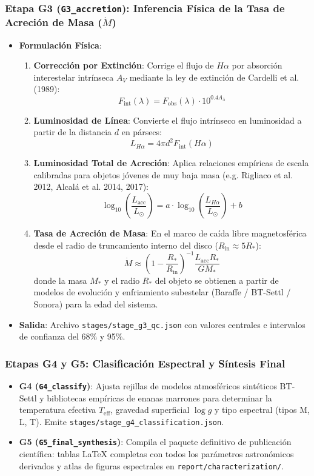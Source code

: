 \documentclass[11pt,a4paper]{article}
\begin{document}
\subsubsection{Etapa G3 (\texttt{G3\_accretion}): Inferencia Física de la Tasa de Acreción de Masa (\texorpdfstring{$\dot{M}$}{Mdot})}
\begin{itemize}[leftmargin=1.0cm]
    \item \textbf{Formulación Física}:
    \begin{enumerate}
        \item \textbf{Corrección por Extinción}: Corrige el flujo de $H\alpha$ por absorción interestelar intrínseca $A_V$ mediante la ley de extinción de Cardelli et al. (1989):
        $$F_\text{int}(\lambda) = F_\text{obs}(\lambda) \cdot 10^{0.4 A_\lambda}$$
        \item \textbf{Luminosidad de Línea}: Convierte el flujo intrínseco en luminosidad a partir de la distancia $d$ en pársecs:
        $$L_{H\alpha} = 4\pi d^2 F_\text{int}(H\alpha)$$
        \item \textbf{Luminosidad Total de Acreción}: Aplica relaciones empíricas de escala calibradas para objetos jóvenes de muy baja masa (e.g. Rigliaco et al. 2012, Alcalá et al. 2014, 2017):
        $$\log_{10}\left(\frac{L_\text{acc}}{L_\odot}\right) = a \cdot \log_{10}\left(\frac{L_{H\alpha}}{L_\odot}\right) + b$$
        \item \textbf{Tasa de Acreción de Masa}: En el marco de caída libre magnetosférica desde el radio de truncamiento interno del disco ($R_\text{in} \approx 5 R_*$):
        $$\dot{M} \approx \left(1 - \frac{R_*}{R_\text{in}}\right)^{-1} \frac{L_\text{acc} R_*}{G M_*}$$
        donde la masa $M_*$ y el radio $R_*$ del objeto se obtienen a partir de modelos de evolución y enfriamiento subestelar (Baraffe / BT-Settl / Sonora) para la edad del sistema.
    \end{enumerate}
    \item \textbf{Salida}: Archivo \texttt{stages/stage\_g3\_qc.json} con valores centrales e intervalos de confianza del 68\% y 95\%.
\end{itemize}

\subsubsection{Etapas G4 y G5: Clasificación Espectral y Síntesis Final}
\begin{itemize}[leftmargin=1.0cm]
    \item \textbf{G4 (\texttt{G4\_classify})}: Ajusta rejillas de modelos atmosféricos sintéticos BT-Settl y bibliotecas empíricas de enanas marrones para determinar la temperatura efectiva $T_\text{eff}$, gravedad superficial $\log g$ y tipo espectral (tipos M, L, T). Emite \texttt{stages/stage\_g4\_classification.json}.
    \item \textbf{G5 (\texttt{G5\_final\_synthesis})}: Compila el paquete definitivo de publicación científica: tablas LaTeX completas con todos los parámetros astronómicos derivados y atlas de figuras espectrales en \texttt{report/characterization/}.
\end{itemize}
\end{document}

